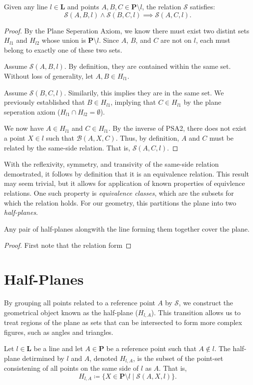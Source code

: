 \documentclass[../../../main/main.tex]{subfiles}
\begin{document}
\begin{theorem}
    Given any line $l \in \mathbf{L}$ and points $A, B, C \in \mathbf{P} \setminus l$, the relation $\mathcal{S}$ satisfies:
    \[
    \mathcal{S}(A, B, l) \land \mathcal{S}(B, C, l) \implies \mathcal{S}(A, C, l).
    \]
\end{theorem}
\begin{proof}
    By the Plane Seperation Axiom, we know there must exist two distint sets $H_{l1}$ and $H_{l2}$ whose union is $\mathbf{P} \setminus l$. Since $A$, $B$, and $C$ are not on $l$, each must belong to exactly one of these two sets.

    Assume $\mathcal{S}(A, B, l)$. By definition, they are contained within the same set. Without loss of generality, let $A, B \in H_{l1}$.

    Assume $\mathcal{S}(B, C, l)$. Similarily, this implies they are in the same set. We previously established that $B \in H_{l1}$, implying that $C \in H_{l1}$ by the plane seperation axiom ($H_{l1} \cap H_{l2} = \emptyset$).

    We now have $A \in H_{l1}$ and $C \in H_{l1}$. By the inverse of PSA2, there does not exist a point $X \in l$ such that $\mathcal{B}(A, X, C)$. Thus, by definition, $A$ and $C$ must be related by the same-side relation. That is, $\mathcal{S}(A, C, l)$.
\end{proof}

With the reflexivity, symmetry, and transivity of the same-side relation demostrated, it follows by definition that it is an equivalence relation. This result may seem trivial, but it allows for application of known properties of equivlence relations. One such property is \textit{equivalence classes}, which are the subsets for which the relation holds. For our geometry, this partitions the plane into two \textit{half-planes}.

\begin{theorem}
    Any pair of half-planes alongwith the line forming them together cover the plane.
\end{theorem}
\begin{proof}
    First note that the relation form
\end{proof}

\section{Half-Planes}
By grouping all points related to a reference point $A$ by $\mathcal{S}$, we construct the geometrical object known as the half-plane ($H_{l,A}$). This transition allows us to treat regions of the plane as sets that can be intersected to form more complex figures, such as angles and triangles.
\begin{definition}
    Let $l \in \mathbf{L}$ be a line and let $A \in \mathbf{P}$ be a reference point such that $A \notin l$. The half-plane detirmined by $l$ and $A$, denoted $H_{l,A}$, is the subset of the point-set consistening of all points on the same side of $l$ as $A$. That is,
    \[
    H_{l,A} \coloneqq \{X \in \mathbf{P} \setminus l \mid \mathcal{S}(A, X, l)\}.
    \]
\end{definition}
\end{document}
